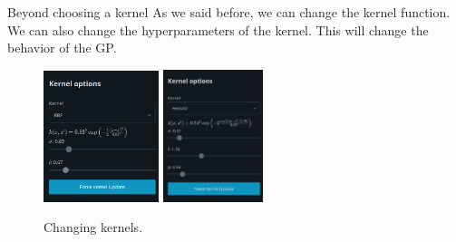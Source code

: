 \documentclass[xcolor=dvipsnames,t,aspectratio=169]{beamer} %
\newcommand{\highlight}[1]{{\color{fgv_light_blue} #1}}
\begin{document}
    

\begin{frame}[c]{Beyond \highlight{choosing} a kernel}
    As we said before, we can change the kernel function. We can also change the \highlight{hyperparameters} of the kernel. This will change the \highlight{behavior} of the GP.

    \begin{figure}[H]
        \centering
        \includegraphics[width=0.30\textwidth]{imgs/kernel-1.png}
        \includegraphics[width=0.26\textwidth]{imgs/kernel-2.png}
        \caption{Changing kernels.}
    \end{figure}

\end{frame}

    
\end{document}
